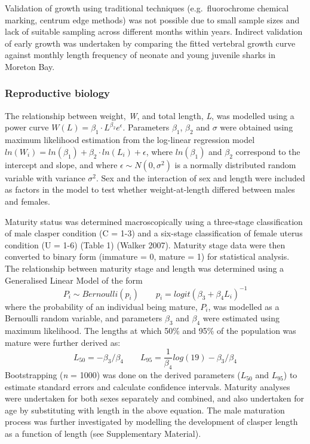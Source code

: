 \documentclass[]{article}
\begin{document}
Validation of growth using traditional techniques (e.g.~fluorochrome
chemical marking, centrum edge methods) was not possible due to small
sample sizes and lack of suitable sampling across different months
within years. Indirect validation of early growth was undertaken by
comparing the fitted vertebral growth curve against monthly length
frequency of neonate and young juvenile sharks in Moreton Bay.

\subsubsection{Reproductive biology}\label{reproductive-biology}

The relationship between weight, \emph{W}, and total length, \emph{L},
was modelled using a power curve
\(W(L) = \beta_1\cdot L^{\beta_2}e^{\epsilon}\). Parameters \(\beta_1\),
\(\beta_2\) and \(\sigma\) were obtained using maximum likelihood
estimation from the log-linear regression model
\(ln(W_i) = ln(\beta_1) + \beta_2\cdot ln(L_i) + \epsilon\), where
\(ln(\beta_1)\) and \(\beta_2\) correspond to the intercept and slope,
and where \(\epsilon \sim N(0, \sigma^2)\) is a normally distributed
random variable with variance \(\sigma^2\). Sex and the interaction of
sex and length were included as factors in the model to test whether
weight-at-length differed between males and females.

Maturity status was determined macroscopically using a three-stage
classification of male clasper condition (C = 1-3) and a six-stage
classification of female uterus condition (U = 1-6) (Table 1) (Walker
2007). Maturity stage data were then converted to binary form (immature
= 0, mature = 1) for statistical analysis. The relationship between
maturity stage and length was determined using a Generalised Linear
Model of the form
\[ P_i \sim Bernoulli(p_i) \quad\quad p_i = logit(\beta_3 + \beta_4 L_i)^{-1}\]
where the probability of an individual being mature, \(P_i\), was
modelled as a Bernoulli random variable, and parameters \(\beta_3\) and
\(\beta_4\) were estimated using maximum likelihood. The lengths at
which 50\% and 95\% of the population was mature were further derived
as:
\[L_{50} = -\beta_3/\beta_4 \quad\quad L_{95}=\frac{1}{\beta_4}log(19)-\beta_3/\beta_4\]
Bootstrapping (\emph{n} = 1000) was done on the derived parameters
(\(L_{50}\) and \(L_{95}\)) to estimate standard errors and calculate
confidence intervals. Maturity analyses were undertaken for both sexes
separately and combined, and also undertaken for age by substituting
with length in the above equation. The male maturation process was
further investigated by modelling the development of clasper length as a
function of length (see Supplementary Material).
\end{document}
